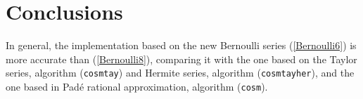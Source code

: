 \section{Conclusions}\label{section5}
In general, the implementation based on the new Bernoulli series (\ref{Bernoulli6})  is more accurate than (\ref{Bernoulli8}), 
comparing it with the one based on the Taylor series, algorithm  (\texttt{cosmtay}) and Hermite series, algorithm   (\texttt{cosmtayher}), 
and the one based in Pad\'e  rational approximation, algorithm (\texttt{cosm}).